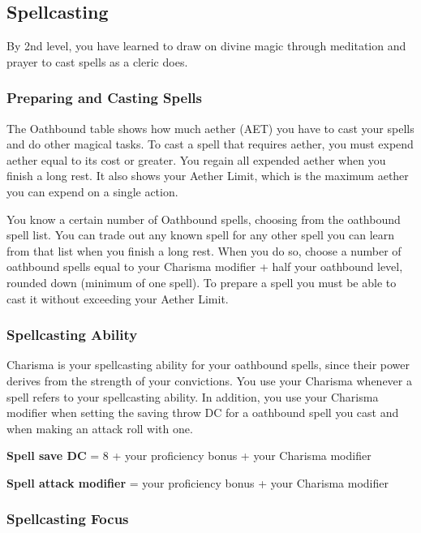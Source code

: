 \subsection{Spellcasting}

By 2nd level, you have learned to draw on divine magic through meditation and prayer to cast spells as a cleric does.

\subsubsection{Preparing and Casting Spells}

The Oathbound table shows how much aether (AET) you have to cast your spells and do other magical tasks. To cast a spell that requires aether, you must expend aether equal to its cost or greater. You regain all expended aether when you finish a long rest. It also shows your Aether Limit, which is the maximum aether you can expend on a single action.

You know a certain number of Oathbound spells, choosing from the oathbound spell list. You can trade out any known spell for any other spell you can learn from that list when you finish a long rest. When you do so, choose a number of oathbound spells equal to your Charisma modifier + half your oathbound level, rounded down (minimum of one spell). To prepare a spell you must be able to cast it without exceeding your Aether Limit.

\subsubsection{Spellcasting Ability}

Charisma is your spellcasting ability for your oathbound spells, since their power derives from the strength of your convictions. You use your Charisma whenever a spell refers to your spellcasting ability. In addition, you use your Charisma modifier when setting the saving throw DC for a oathbound spell you cast and when making an attack roll with one.

\textbf{Spell save DC} = 8 + your proficiency bonus + your Charisma modifier

\textbf{Spell attack modifier} = your proficiency bonus + your Charisma modifier

\subsubsection{Spellcasting Focus}

